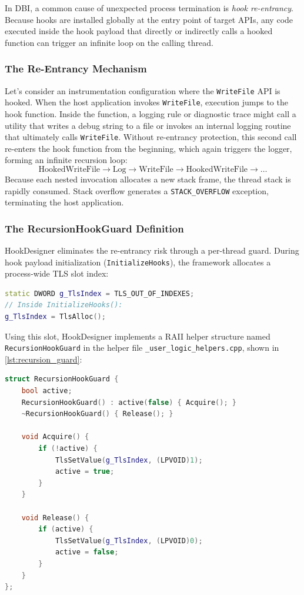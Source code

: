 In \ac{DBI}, a common cause of unexpected process termination is \emph{hook re-entrancy}.
Because hooks are installed globally at the entry point of target APIs, any code executed inside the hook payload that directly or indirectly calls a hooked function can trigger an infinite loop on the calling thread.

\subsubsection{The Re-Entrancy Mechanism}

Let's consider an instrumentation configuration where the \texttt{WriteFile} API is hooked.
When the host application invokes \texttt{WriteFile}, execution jumps to the hook function.
Inside the function, a logging rule or diagnostic trace might call a utility that writes a debug string to a file or invokes an internal logging routine that ultimately calls \texttt{WriteFile}.
Without re-entrancy protection, this second call re-enters the hook function from the beginning, which again triggers the logger, forming an infinite recursion loop:
$$\text{HookedWriteFile} \longrightarrow \text{Log} \longrightarrow \text{WriteFile} \longrightarrow \text{HookedWriteFile} \longrightarrow \dots$$
Because each nested invocation allocates a new stack frame, the thread stack is rapidly consumed.
Stack overflow generates a \texttt{STACK\_OVERFLOW} exception, terminating the host application.

\subsubsection{The RecursionHookGuard Definition}

HookDesigner eliminates the re-entrancy risk through a per-thread 
guard.
During hook payload initialization (\texttt{InitializeHooks}), the framework allocates a process-wide TLS slot index:
\begin{lstlisting}[language=C++, basicstyle=\ttfamily\footnotesize]
static DWORD g_TlsIndex = TLS_OUT_OF_INDEXES;
// Inside InitializeHooks():
g_TlsIndex = TlsAlloc();
\end{lstlisting}

Using this slot, HookDesigner implements a RAII helper structure named \texttt{RecursionHookGuard} in the helper file \texttt{\_user\_logic\_helpers.cpp}, shown in \cref{lst:recursion_guard}:

\begin{lstlisting}[language=C++, caption={\texttt{RecursionHookGuard} RAII implementation in \texttt{\_user\_logic\_helpers.cpp}.}, label={lst:recursion_guard}, basicstyle=\ttfamily\footnotesize, breaklines=true]
struct RecursionHookGuard {
    bool active;
    RecursionHookGuard() : active(false) { Acquire(); }
    ~RecursionHookGuard() { Release(); }

    void Acquire() {
        if (!active) {
            TlsSetValue(g_TlsIndex, (LPVOID)1);
            active = true;
        }
    }

    void Release() {
        if (active) {
            TlsSetValue(g_TlsIndex, (LPVOID)0);
            active = false;
        }
    }
};
\end{lstlisting}

